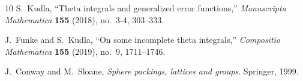 \documentclass[12pt,letterpaper]{JHEP3}
\begin{document}
\begin{thebibliography}{10}
	S.~Kudla, ``Theta integrals and generalized error functions,'' {\em Manuscripta
		Mathematica} {\bf 155} (2018), no.~3-4, 303--333.
	
	J.~Funke and S.~Kudla, ``On some incomplete theta integrals,'' {\em Compositio
		Mathematica} {\bf 155} (2019), no.~9, 1711–1746.
	
	J.~Conway and M.~Sloane, {\em Sphere packings, lattices and groups}.
	\newblock Springer, 1999.
	
\end{thebibliography}\endgroup


%
%
\end{document}
